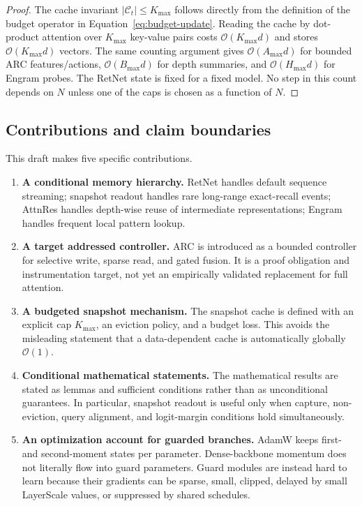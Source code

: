 \documentclass[11pt]{article}
\newcommand{\Cache}{\mathcal{C}}
\newcommand{\Oh}{\mathcal{O}}
\begin{document}
\begin{proof}
The cache invariant $|\Cache_t|\leq K_{\max}$ follows directly from the definition of the budget operator in Equation~\eqref{eq:budget-update}. Reading the cache by dot-product attention over $K_{\max}$ key-value pairs costs $\Oh(K_{\max}d)$ and stores $\Oh(K_{\max}d)$ vectors. The same counting argument gives $\Oh(A_{\max}d)$ for bounded ARC features/actions, $\Oh(B_{\max}d)$ for depth summaries, and $\Oh(H_{\max}d)$ for Engram probes. The RetNet state is fixed for a fixed model. No step in this count depends on $N$ unless one of the caps is chosen as a function of $N$.
\end{proof}

\subsection{Contributions and claim boundaries}

This draft makes five specific contributions.
\begin{enumerate}
    \item \textbf{A conditional memory hierarchy.} RetNet handles default sequence streaming; snapshot readout handles rare long-range exact-recall events; AttnRes handles depth-wise reuse of intermediate representations; Engram handles frequent local pattern lookup.
    \item \textbf{A target addressed controller.} ARC is introduced as a bounded controller for selective write, sparse read, and gated fusion. It is a proof obligation and instrumentation target, not yet an empirically validated replacement for full attention.
    \item \textbf{A budgeted snapshot mechanism.} The snapshot cache is defined with an explicit cap $K_{\max}$, an eviction policy, and a budget loss. This avoids the misleading statement that a data-dependent cache is automatically globally $\Oh(1)$.
    \item \textbf{Conditional mathematical statements.} The mathematical results are stated as lemmas and sufficient conditions rather than as unconditional guarantees. In particular, snapshot readout is useful only when capture, non-eviction, query alignment, and logit-margin conditions hold simultaneously.
    \item \textbf{An optimization account for guarded branches.} AdamW keeps first- and second-moment states per parameter. Dense-backbone momentum does not literally flow into guard parameters. Guard modules are instead hard to learn because their gradients can be sparse, small, clipped, delayed by small LayerScale values, or suppressed by shared schedules.
\end{enumerate}
\end{document}
